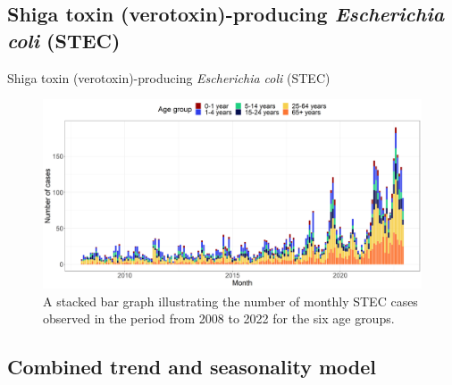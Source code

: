 \documentclass[aspectratio=169]{beamer}
\begin{document}
\hypertarget{shiga-toxin-verotoxin-producing-escherichia-coli-stec}{%
\subsection{\texorpdfstring{Shiga toxin (verotoxin)-producing
\emph{Escherichia coli}
(STEC)}{Shiga toxin (verotoxin)-producing Escherichia coli (STEC)}}\label{shiga-toxin-verotoxin-producing-escherichia-coli-stec}}

\begin{frame}{Shiga toxin (verotoxin)-producing \emph{Escherichia coli}
(STEC)}
\tiny

\begin{figure}[H]
\includegraphics[width=0.75\linewidth]{../figures/STEC_long_plot} \caption{A stacked bar graph illustrating the number of monthly STEC cases observed in the period from 2008 to 2022 for the six age groups.}\label{fig:STEC}
\end{figure}

\normalsize
\end{frame}

\hypertarget{combined-trend-and-seasonality-model}{%
\subsection{Combined trend and seasonality
model}\label{combined-trend-and-seasonality-model}}
\end{document}
